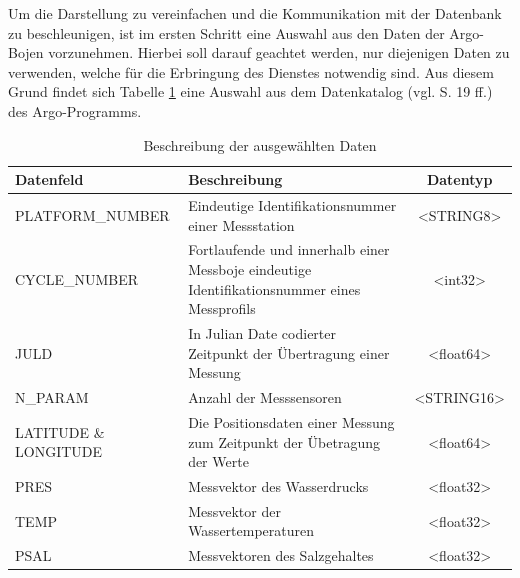 Um die Darstellung zu vereinfachen und die Kommunikation mit der Datenbank zu beschleunigen, ist im ersten Schritt eine Auswahl aus den Daten der Argo-Bojen vorzunehmen. Hierbei soll darauf geachtet werden, nur diejenigen Daten zu verwenden, welche für die Erbringung des Dienstes notwendig sind. Aus diesem Grund findet sich  Tabelle \ref{table:Datenauswahl} eine Auswahl aus dem Datenkatalog (vgl. \cite{ArgoUserManual} S. 19 ff.) des Argo-Programms. \\
\begin{table} 
\centering
  \begin{tabular}{ | l | p{7cm}| c |}
    \hline
    \textbf{Datenfeld} & \textbf{Beschreibung} & \textbf{Datentyp} \\\hline
   
    PLATFORM\_NUMBER 
        &  Eindeutige Identifikationsnummer einer Messstation
        & <STRING8>
        \\\hline 
    
    CYCLE\_NUMBER 
        &  Fortlaufende und innerhalb einer Messboje eindeutige Identifikationsnummer eines Messprofils
        & <int32>
        \\\hline
    
    JULD
        & In Julian Date codierter Zeitpunkt der Übertragung  einer Messung
        & <float64>
       \\\hline
        
    N\_PARAM
        & Anzahl der Messsensoren
        & <STRING16>
        \\\hline
        
    LATITUDE \& LONGITUDE
        & Die Positionsdaten einer Messung zum Zeitpunkt der Übetragung der Werte
        & <float64>
        \\\hline
        
    PRES
        & Messvektor des Wasserdrucks
        & <float32>
        \\\hline
        
    TEMP
        & Messvektor der Wassertemperaturen 
        & <float32>
          \\\hline
        
    PSAL
        & Messvektoren des Salzgehaltes
        & <float32>
         \\\hline
    \end{tabular}
      \caption{Beschreibung der ausgewählten Daten}
      \label{table:Datenauswahl}
\end{table}

